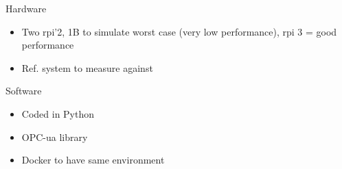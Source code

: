 \begin{block}{Hardware}    
    \begin{itemize}
        \item Two rpi'2, 1B to simulate worst case (very low performance), rpi 3 = good performance
        \item Ref. system to measure against
    \end{itemize}
\end{block}

\begin{block}{Software}
    \begin{itemize}
        \item Coded in Python
        \item OPC-ua library
        \item Docker to have same environment
    \end{itemize}
    
\end{block}